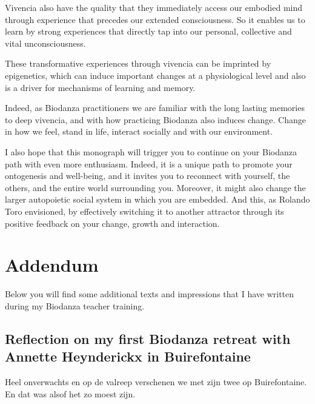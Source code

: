 \documentclass[
  11pt,
]{book}
\begin{document}
Vivencia also have the quality that they immediately access our embodied mind through experience that precedes our extended consciousness. So it enables us to learn by strong experiences that directly tap into our personal, collective and vital unconsciousness.

These transformative experiences through vivencia can be imprinted by epigenetics, which can induce important changes at a physiological level and also is a driver for mechanisms of learning and memory.

Indeed, as Biodanza practitioners we are familiar with the long lasting memories to deep vivencia, and with how practicing Biodanza also induces change.
Change in how we feel, stand in life, interact socially and with our environment.

I also hope that this monograph will trigger you to continue on your Biodanza path with even more enthusiasm. Indeed, it is a unique path to promote your ontogenesis and well-being, and it invites you to reconnect with yourself, the others, and the entire world surrounding you. Moreover, it might also change the larger autopoietic social system in which you are embedded. And this, as Rolando Toro envisioned, by effectively switching it to another attractor through its positive feedback on your change, growth and interaction.

\hypertarget{addendum}{%
\chapter*{Addendum}\label{addendum}}

Below you will find some additional texts and impressions that I have written during my Biodanza teacher training.

\hypertarget{reflection-on-my-first-biodanza-retreat-with-annette-heynderickx-in-buirefontaine}{%
\section*{Reflection on my first Biodanza retreat with Annette Heynderickx in Buirefontaine}\label{reflection-on-my-first-biodanza-retreat-with-annette-heynderickx-in-buirefontaine}}

Heel onverwachts en op de valreep verschenen we met zijn twee op Buirefontaine.\\
En dat was alsof het zo moest zijn.
\end{document}
